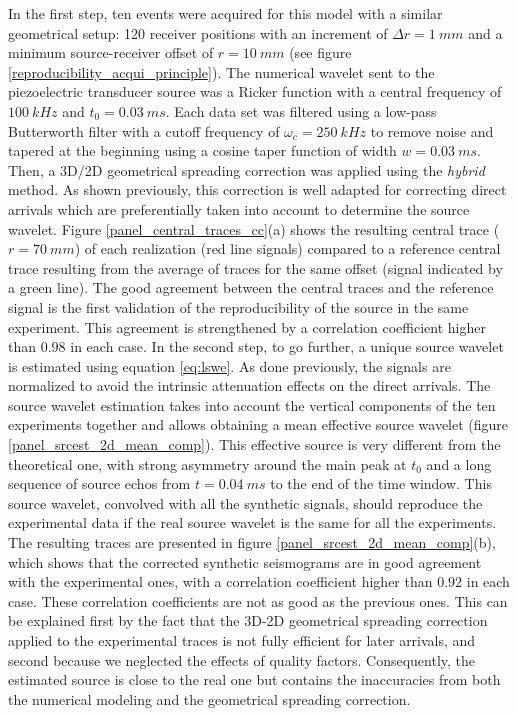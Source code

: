 \documentclass[paper,extra]{gji} %
\begin{document}
\noindent In the first step, ten events were acquired for this model with a similar geometrical setup: 120 receiver positions with an increment of $\Delta r= 1\ mm$ and a minimum source-receiver offset of $r=10\ mm$ (see figure \ref{reproducibility_acqui_principle}). The numerical wavelet sent to the piezoelectric transducer source was a Ricker function with a central frequency of $100\ kHz$ and $t_{0}=0.03\ ms$. Each data set was filtered using a low-pass Butterworth filter with a cutoff frequency of $\omega_{c}=250\ kHz$ to remove noise and tapered at the beginning using a cosine taper function of width $w=0.03\ ms$. Then, a 3D/2D geometrical spreading correction was applied using the \textit{hybrid} method. As shown previously, this correction is well adapted for correcting direct arrivals which are preferentially taken into account to determine the source wavelet. Figure \ref{panel_central_traces_cc}(a) shows the resulting central trace ($r=70\ mm$) of each realization (red line signals) compared to a reference central trace resulting from the average of traces for the same offset (signal indicated by a green line). The good agreement between the central traces and the reference signal is the first validation of the reproducibility of the source in the same experiment. This agreement is strengthened by a correlation coefficient higher than $0.98$ in each case. In the second step, to go further, a unique source wavelet is estimated using equation \ref{eq:lswe}. As done previously, the signals are normalized to avoid the intrinsic attenuation effects on the direct arrivals. The source wavelet estimation takes into account the vertical components of the ten experiments together and allows obtaining a mean effective source wavelet (figure \ref{panel_srcest_2d_mean_comp}). This effective source is very different from the theoretical one, with strong asymmetry around the main peak at $t_{0}$ and a long sequence of source echos from $t=0.04\ ms$ to the end of the time window. This source wavelet, convolved with all the synthetic signals, should reproduce the experimental data if the real source wavelet is the same for all the experiments. The resulting traces are presented in figure \ref{panel_srcest_2d_mean_comp}(b), which shows that the corrected synthetic seismograms are in good agreement with the experimental ones, with a correlation coefficient higher than $0.92$ in each case. These correlation coefficients are not as good as the previous ones. This can be explained first by the fact that the 3D-2D geometrical spreading correction applied to the experimental traces is not fully efficient for later arrivals, and second because we neglected the effects of quality factors. Consequently, the estimated source is close to the real one but contains the inaccuracies from both the numerical modeling and the geometrical spreading correction. 
\end{document}
